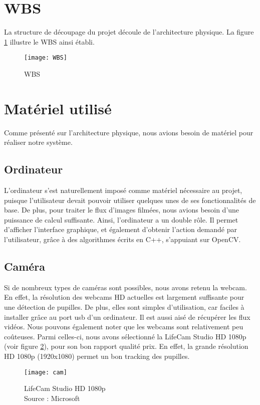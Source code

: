\section{WBS}
La structure de découpage du projet découle de l'architecture physique. La figure \ref{fig:WBS} illustre le WBS ainsi établi. 

\begin{figure}[H]
  \centering
  \texttt{[image: WBS]}
  \caption{WBS}
  \label{fig:WBS}
\end{figure}

\section{Matériel utilisé}

Comme présenté sur l'architecture physique, nous avions besoin de matériel pour réaliser notre système.

\subsection{Ordinateur}
L'ordinateur s'est naturellement imposé comme matériel nécessaire au projet, puisque l'utilisateur devait pouvoir utiliser quelques unes de ses fonctionnalités de base. De plus, pour traiter le flux d'images filmées, nous avions besoin d'une puissance de calcul suffisante. Ainsi, l'ordinateur a un double rôle. Il permet d'afficher l'interface graphique, et également d'obtenir l'action demandé par l'utilisateur, grâce à des algorithmes écrits en C++, s'appuiant sur OpenCV. 

\subsection{Caméra}
Si de nombreux types de caméras sont possibles, nous avons retenu la webcam. En effet, la résolution des webcams HD actuelles est largement suffisante pour une détection de pupilles. De plus, elles sont simples d'utilisation, car faciles à installer grâce au port usb d'un ordinateur. Il est aussi aisé de récupérer les flux vidéos. Nous pouvons également noter que les webcams sont relativement peu coûteuses.
Parmi celles-ci, nous avons sélectionné la LifeCam Studio HD 1080p (voir figure \ref{fig:Cam}), pour son bon rapport qualité prix. En effet, la grande résolution HD 1080p (1920x1080) permet un bon tracking des pupilles.

\begin{figure}[H]
  \centering
  \texttt{[image: cam]}
  \caption{LifeCam Studio HD 1080p \\Source : Microsoft}
  \label{fig:Cam}
\end{figure}

